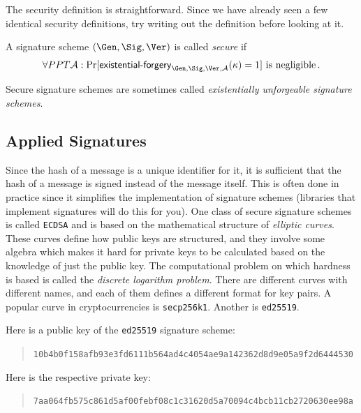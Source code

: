 The security definition is straightforward. Since we have already seen a few
identical security definitions, try writing out the definition before looking
at it.

\begin{definition}
  A signature scheme $(\Gen, \Sig, \Ver)$ is called \emph{secure} if
  \begin{align*}
    \forall PPT \mathcal{A}:
    \Pr[\textsf{existential-forgery}_{\Gen, \Sig, \Ver, \mathcal{A}}(\kappa) = 1] \text{ is negligible}\,.
  \end{align*}
\end{definition}

Secure signature schemes are sometimes called \emph{existentially unforgeable signature
schemes}.

\subsection*{Applied Signatures}

Since the hash of a message is a unique identifier for it, it is sufficient that
the hash of a message is signed instead of the message itself. This is often done
in practice since it simplifies the implementation of signature schemes (libraries that implement
signatures will do this for you).
One class of secure signature schemes is called
\texttt{ECDSA} and is based on the mathematical structure of \emph{elliptic curves}.
These curves define how public keys are structured, and they involve some algebra
which makes it hard for private keys to be calculated based on the knowledge of
just the public key. The computational problem on which hardness is based is called
the \emph{discrete logarithm problem}.
There are different curves with different names, and each of them
defines a different format for key pairs.
A popular curve in cryptocurrencies is
\texttt{secp256k1}. Another is \texttt{ed25519}.

Here is a public key of the \texttt{ed25519} signature scheme:

\begin{quote}
\texttt{10b4b0f158afb93e3fd6111b564ad4c4054ae9a142362d8d9e05a9f2d6444530}
\end{quote}

Here is the respective private key:

\begin{quote}
\texttt{7aa064fb575c861d5af00febf08c1c31620d5a70094c4bcb11cb2720630ee98a}
\end{quote}

